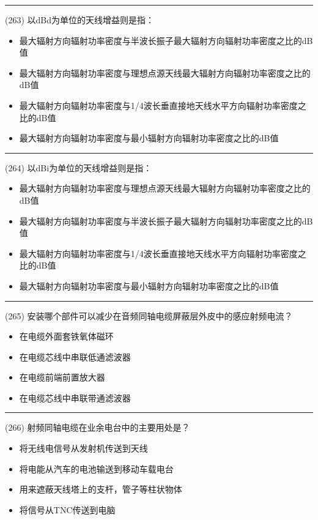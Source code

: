 \documentclass[twocolumn]{ctexart}  %
\begin{document}
\noindent\rule{0.5\textwidth}{1pt}
\heiti (263) 以dBd为单位的天线增益则是指： \songti {\color{gray} [LK1062] }
\begin{itemize}
	\item  最大辐射方向辐射功率密度与半波长振子最大辐射方向辐射功率密度之比的dB值
	\item  最大辐射方向辐射功率密度与理想点源天线最大辐射方向辐射功率密度之比的dB值
	\item  最大辐射方向辐射功率密度与1/4波长垂直接地天线水平方向辐射功率密度之比的dB值
	\item  最大辐射方向辐射功率密度与最小辐射方向辐射功率密度之比的dB值
\end{itemize}


\noindent\rule{0.5\textwidth}{1pt}
\heiti (264) 以dBi为单位的天线增益则是指： \songti {\color{gray} [LK1063] }
\begin{itemize}
	\item  最大辐射方向辐射功率密度与理想点源天线最大辐射方向辐射功率密度之比的dB值
	\item  最大辐射方向辐射功率密度与半波长振子最大辐射方向辐射功率密度之比的dB值
	\item  最大辐射方向辐射功率密度与1/4波长垂直接地天线水平方向辐射功率密度之比的dB值
	\item  最大辐射方向辐射功率密度与最小辐射方向辐射功率密度之比的dB值
\end{itemize}


\noindent\rule{0.5\textwidth}{1pt}
\heiti (265) 安装哪个部件可以减少在音频同轴电缆屏蔽层外皮中的感应射频电流？ \songti {\color{gray} [LK1126] }
\begin{itemize}
	\item  在电缆外面套铁氧体磁环
	\item  在电缆芯线中串联低通滤波器
	\item  在电缆前端前置放大器
	\item  在电缆芯线中串联带通滤波器
\end{itemize}


\noindent\rule{0.5\textwidth}{1pt}
\heiti (266) 射频同轴电缆在业余电台中的主要用处是？ \songti {\color{gray} [LK1173] }
\begin{itemize}
	\item  将无线电信号从发射机传送到天线
	\item  将电能从汽车的电池输送到移动车载电台
	\item  用来遮蔽天线塔上的支杆，管子等柱状物体
	\item  将信号从TNC传送到电脑
\end{itemize}
\end{document}
